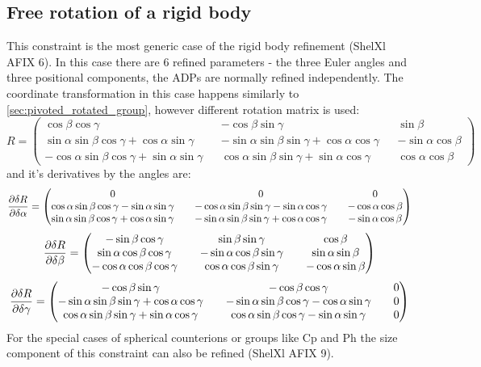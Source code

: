 \documentclass[pdf]{iucr}
\begin{document}
\subsection{Free rotation of a rigid body}
This constraint is the most generic case of the rigid body refinement (ShelXl AFIX 6). In this case there are 6 refined parameters - the three Euler angles and three positional components, the ADPs are normally refined independently. The coordinate transformation in this case happens similarly to \ref{sec:pivoted_rotated_group}, however different rotation matrix is used:
\onecolumn
\begin{equation}
R = \begin{pmatrix} \label{eq:erm}
  \cos\beta\cos\gamma && -\cos\beta\sin\gamma && \sin\beta \\
  \sin\alpha\sin\beta\cos\gamma + \cos\alpha\sin\gamma && -\sin\alpha\sin\beta\sin\gamma+\cos\alpha\cos\gamma && -\sin\alpha\cos\beta \\
  -\cos\alpha\sin\beta\cos\gamma+\sin\alpha\sin\gamma && \cos\alpha\sin\beta\sin\gamma+\sin\alpha\cos\gamma && \cos\alpha\cos\beta
\end{pmatrix}
\end{equation}
and it's derivatives by the angles are:
\begin{equation}
\frac{\partial \delta R}{\partial \delta \alpha} = \begin{pmatrix}
  0 && 0 && 0 \\
  \cos\alpha\sin\beta\cos\gamma - \sin\alpha\sin\gamma && -\cos\alpha\sin\beta\sin\gamma-\sin\alpha\cos\gamma && -\cos\alpha\cos\beta \\
  \sin\alpha\sin\beta\cos\gamma+\cos\alpha\sin\gamma && -\sin\alpha\sin\beta\sin\gamma+\cos\alpha\cos\gamma && -\sin\alpha\cos\beta
\end{pmatrix}
\end{equation}
\begin{equation}
\frac{\partial \delta R}{\partial \delta \beta} = \begin{pmatrix}
  -\sin\beta\cos\gamma && \sin\beta\sin\gamma && \cos\beta \\
  \sin\alpha\cos\beta\cos\gamma && -\sin\alpha\cos\beta\sin\gamma && \sin\alpha\sin\beta \\
  -\cos\alpha\cos\beta\cos\gamma && \cos\alpha\cos\beta\sin\gamma && -\cos\alpha\sin\beta
\end{pmatrix}
\end{equation}
\begin{equation}
\frac{\partial \delta R}{\partial \delta \gamma} = \begin{pmatrix}
  -\cos\beta\sin\gamma && -\cos\beta\cos\gamma && 0 \\
  -\sin\alpha\sin\beta\sin\gamma + \cos\alpha\cos\gamma && -\sin\alpha\sin\beta\cos\gamma-\cos\alpha\sin\gamma && 0 \\
  \cos\alpha\sin\beta\sin\gamma+\sin\alpha\cos\gamma && \cos\alpha\sin\beta\cos\gamma-\sin\alpha\sin\gamma && 0
\end{pmatrix}
\end{equation}
\twocolumn
For the special cases of spherical counterions or groups like Cp and Ph the size component of this constraint can also be refined (ShelXl AFIX 9).
\end{document}
